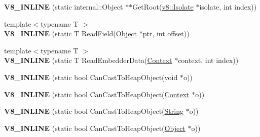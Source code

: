 \begin{DoxyCompactItemize}
\item 
\hypertarget{classv8_1_1internal_1_1_internals_a43d16f21d492bab553ecbe80930b7cf8}{}{\bfseries V8\+\_\+\+I\+N\+L\+I\+N\+E} (static internal\+::\+Object $\ast$$\ast$Get\+Root(\hyperlink{classv8_1_1_isolate}{v8\+::\+Isolate} $\ast$isolate, int index))\label{classv8_1_1internal_1_1_internals_a43d16f21d492bab553ecbe80930b7cf8}

\item 
\hypertarget{classv8_1_1internal_1_1_internals_a07da7e32f4f7ee58846b6f54f6785ed3}{}{\footnotesize template$<$typename T $>$ }\\{\bfseries V8\+\_\+\+I\+N\+L\+I\+N\+E} (static T Read\+Field(\hyperlink{classv8_1_1_object}{Object} $\ast$ptr, int offset))\label{classv8_1_1internal_1_1_internals_a07da7e32f4f7ee58846b6f54f6785ed3}

\item 
\hypertarget{classv8_1_1internal_1_1_internals_a065d87c2ee41c1a93c59ca9b3cc361dd}{}{\footnotesize template$<$typename T $>$ }\\{\bfseries V8\+\_\+\+I\+N\+L\+I\+N\+E} (static T Read\+Embedder\+Data(\hyperlink{classv8_1_1_context}{Context} $\ast$context, int index))\label{classv8_1_1internal_1_1_internals_a065d87c2ee41c1a93c59ca9b3cc361dd}

\item 
\hypertarget{classv8_1_1internal_1_1_internals_a37bdb8bc6f18868b28b81238103ec04a}{}{\bfseries V8\+\_\+\+I\+N\+L\+I\+N\+E} (static bool Can\+Cast\+To\+Heap\+Object(void $\ast$o))\label{classv8_1_1internal_1_1_internals_a37bdb8bc6f18868b28b81238103ec04a}

\item 
\hypertarget{classv8_1_1internal_1_1_internals_a14d1baa0483d1c63ddb360e47766581a}{}{\bfseries V8\+\_\+\+I\+N\+L\+I\+N\+E} (static bool Can\+Cast\+To\+Heap\+Object(\hyperlink{classv8_1_1_context}{Context} $\ast$o))\label{classv8_1_1internal_1_1_internals_a14d1baa0483d1c63ddb360e47766581a}

\item 
\hypertarget{classv8_1_1internal_1_1_internals_a42a605e97d72df73beff0010551260b5}{}{\bfseries V8\+\_\+\+I\+N\+L\+I\+N\+E} (static bool Can\+Cast\+To\+Heap\+Object(\hyperlink{classv8_1_1_string}{String} $\ast$o))\label{classv8_1_1internal_1_1_internals_a42a605e97d72df73beff0010551260b5}

\item 
\hypertarget{classv8_1_1internal_1_1_internals_a6cd35b7bff8944dae049cf6a41569a15}{}{\bfseries V8\+\_\+\+I\+N\+L\+I\+N\+E} (static bool Can\+Cast\+To\+Heap\+Object(\hyperlink{classv8_1_1_object}{Object} $\ast$o))\label{classv8_1_1internal_1_1_internals_a6cd35b7bff8944dae049cf6a41569a15}


\end{DoxyCompactItemize}
